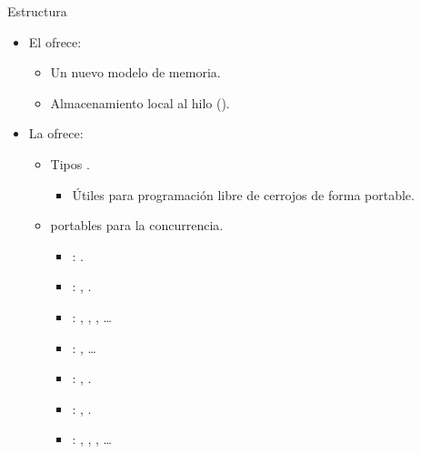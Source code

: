 \begin{frame}[t]{Estructura}
\begin{itemize}
  \item El  ofrece:
    \begin{itemize}
      \item Un nuevo modelo de memoria.
      \item Almacenamiento local al hilo ().
    \end{itemize}

  \item La  ofrece:
    \begin{itemize}
      \item Tipos .
        \begin{itemize}
          \item Útiles para programación libre de cerrojos de forma portable.
        \end{itemize}
      \item {} portables para la concurrencia.
        \begin{itemize}
          \item {}:  .
          \item {}: , .
          \item {}: , , 
                                                , \ldots
          \item {}: , \ldots
          \item {}: , .
          \item {}: , .
          \item {}: , ,
                                                , \ldots
        \end{itemize}
    \end{itemize}
\end{itemize}
\end{frame}

